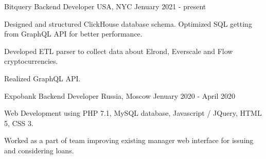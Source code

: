 
\begin{cventries}

\cventry
{Bitquery} %
{Backend Developer} %
{USA, NYC} %
{Jenuary 2021 - present} %
{
	\begin{cvitems} %
        \item {Designed and structured ClickHouse database schema. Optimized SQL getting from GraphQL API for better performance.}
  		\item {Developed ETL parser to collect data about Elrond, Everscale and Flow cryptocurrencies.}
		\item {Realized GraphQL API.}
	\end{cvitems}
}


\cventry
{Expobank} %
{Backend Developer} %
{Russia, Moscow} %
{Jenuary 2020 - April 2020} %
{
	\begin{cvitems} %
		\item {Web Development using PHP 7.1, MySQL database, Javascript / JQuery, HTML 5, CSS 3.}
		\item {Worked as a part of team improving existing manager web interface for issuing and considering loans.}
	\end{cvitems}
}

\end{cventries}
